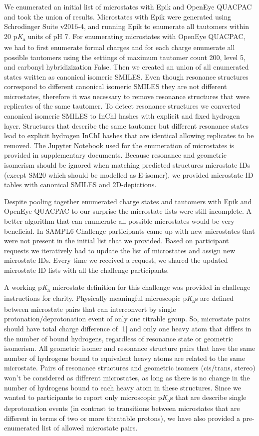 \documentclass[9pt,lineno,final]{elife}
\newcommand{\pKa}{p\textit{K}\textsubscript{a}}
\begin{document}
We enumerated an initial list of microstates with Epik and OpenEye QUACPAC and took the union of results. 
Microstates with Epik were generated using Schrodinger Suite v2016-4, and running Epik to enumerate all tautomers within 20 \pKa{} units of pH 7.
For enumerating microstates with OpenEye QUACPAC, we had to first enumerate formal charges and for each charge enumerate all possible tautomers using the settings of maximum tautomer count 200, level 5, and carbonyl hybridizization False.
Then we created an union of all enumerated states written as canonical isomeric SMILES.
Even though resonance structures correspond to different canonical isomeric SMILES they are not different microstates, therefore it was necessary to remove resonance structures that were replicates of the same tautomer. To detect resonance structures we converted canonical isomeric SMILES to InChI hashes with explicit and fixed hydrogen layer. Structures that describe the same tautomer but different resonance states lead to explicit hydrogen InChI hashes that are identical allowing replicates to be removed. The Jupyter Notebook used for the enumeration of microstates is provided in supplementary documents. Because resonance and geometric isomerism should be ignored when matching predicted structures microstate IDs (except SM20 which should be modelled as E-isomer), we provided microstate ID tables with canonical SMILES and 2D-depictions. 

Despite pooling together enumerated charge states and tautomers with Epik and OpenEye QUACPAC to our surprise the microstate lists were still incomplete.
A better algorithm that can enumerate all possible microstates would be very beneficial. 
In SAMPL6 Challenge participants came up with new microstates that were not present in the initial list that we provided. 
Based on participant requests we iteratively had to update the list of microstates and assign new microstate IDs.
Every time we received a request, we shared the updated microstate ID lists with all the challenge participants.

A working \pKa{} microstate definition for this challenge was provided in challenge instructions for clarity. 
Physically meaningful microscopic \pKa{}s are defined between microstate pairs that can interconvert by single protonation/deprotonation event of only one titrable group. 
So, microstate pairs should have total charge difference of |1| and only one heavy atom that differs in the number of bound hydrogens, regardless of resonance state or geometric isomerism. 
All geometric isomer and resonance structure pairs that have the same number of hydrogens bound to equivalent heavy atoms are related to the same microstate. 
Pairs of resonance structures and geometric isomers (cis/trans, stereo) won't be considered as different microstates, as long as there is no change in the number of hydrogens bound to each heavy atom in these structures.
Since we wanted to participants to report only microscopic \pKa{}s that are describe single deprotonation events (in contrast to transitions between microstates that are different in terms of two or more titratable protons), we have also provided a pre-enumerated list of allowed microstate pairs.
\end{document}
